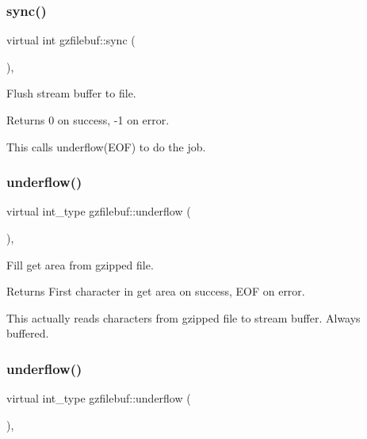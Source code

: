 \subsubsection{\texorpdfstring{sync()}{sync()}\hspace{0.1cm}{\footnotesize\ttfamily [2/2]}}
{\footnotesize\ttfamily virtual int gzfilebuf\+::sync (\begin{DoxyParamCaption}{ }\end{DoxyParamCaption})\hspace{0.3cm}{\ttfamily [protected]}, {\ttfamily [virtual]}}



Flush stream buffer to file. 

\begin{DoxyReturn}{Returns}
0 on success, -\/1 on error.
\end{DoxyReturn}
This calls underflow(\+E\+O\+F) to do the job. \mbox{\label{classgzfilebuf_a23768f9935022e54608c53173f0047c0}} 
\subsubsection{\texorpdfstring{underflow()}{underflow()}\hspace{0.1cm}{\footnotesize\ttfamily [1/2]}}
{\footnotesize\ttfamily virtual int\+\_\+type gzfilebuf\+::underflow (\begin{DoxyParamCaption}{ }\end{DoxyParamCaption})\hspace{0.3cm}{\ttfamily [protected]}, {\ttfamily [virtual]}}



Fill get area from gzipped file. 

\begin{DoxyReturn}{Returns}
First character in get area on success, E\+OF on error.
\end{DoxyReturn}
This actually reads characters from gzipped file to stream buffer. Always buffered. \mbox{\label{classgzfilebuf_a23768f9935022e54608c53173f0047c0}} 
\subsubsection{\texorpdfstring{underflow()}{underflow()}\hspace{0.1cm}{\footnotesize\ttfamily [2/2]}}
{\footnotesize\ttfamily virtual int\+\_\+type gzfilebuf\+::underflow (\begin{DoxyParamCaption}{ }\end{DoxyParamCaption})\hspace{0.3cm}{\ttfamily [protected]}, {\ttfamily [virtual]}}



